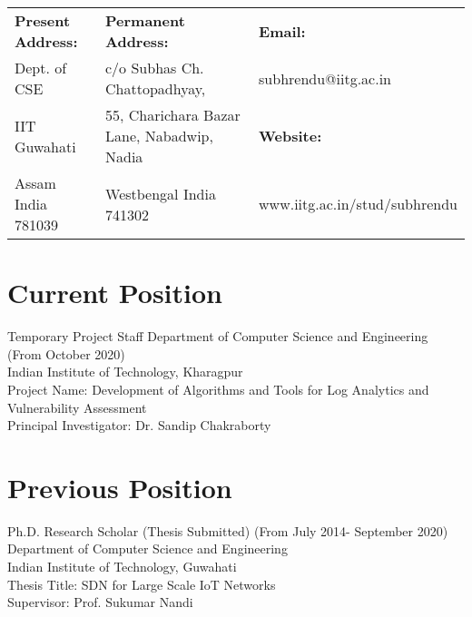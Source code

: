 \documentclass{article}
\begin{document}
 
\begin{center}
	\Large{\bf \name}
\end{center}
%                                  
	\begin{table}[h]
	\centering
	\begin{tabular}{|lll|}
	\hline
	{\bf Present Address:}    & {\bf Permanent Address:}        					&	{\bf Email:}               \\
	Dept. of CSE       				& c/o Subhas Ch. Chattopadhyay, 					&	subhrendu@iitg.ac.in         \\
	IIT Guwahati       			& 55, Charichara Bazar Lane, Nabadwip, Nadia  &	{\bf Website:}  \\
	Assam India 781039 		& Westbengal  India 741302 							&	www.iitg.ac.in/stud/subhrendu \\ \hline
	\end{tabular}
	\end{table}
 \noindent\makebox[\linewidth]{\rule{\textwidth}{0.4pt}}
\section{Current Position}          
Temporary 	Project Staff
Department of Computer Science and Engineering (From October 2020)\\
Indian Institute of Technology, Kharagpur\\
Project Name: Development of Algorithms and Tools for Log Analytics  and Vulnerability Assessment \\
Principal Investigator: Dr. Sandip Chakraborty
\section{Previous Position}
	Ph.D. Research Scholar (Thesis Submitted)  (From July 2014- September 2020)\\
    Department of Computer Science and Engineering\\
    Indian Institute of Technology, Guwahati\\
    Thesis Title: SDN for Large Scale IoT Networks\\
    Supervisor: Prof. Sukumar Nandi
\end{document}
